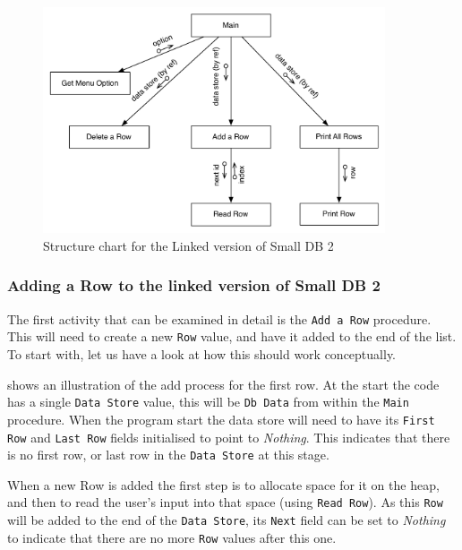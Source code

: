 \begin{figure}[htbp]
   \centering
   \includegraphics[width=0.90\textwidth]{./topics/dynamic-memory/diagrams/LinkedSmallDB2Structure} 
   \caption{Structure chart for the Linked version of Small DB 2}
   \label{fig:linked-small-db-2-struct}
\end{figure}

\clearpage
\subsubsection{Adding a Row to the linked version of Small DB 2} %
\label{ssub:adding_a_row_to_the_linked_version_of_small_db_2}

The first activity that can be examined in detail is the \texttt{Add a Row} procedure. This will need to create a new \texttt{Row} value, and have it added to the end of the list. To start with, let us have a look at how this should work conceptually.

 shows an illustration of the add process for the first row. At the start the code has a single \texttt{Data Store} value, this will be \texttt{Db Data} from within the \texttt{Main} procedure. When the program start the data store will need to have its \texttt{First Row} and \texttt{Last Row} fields initialised to point to \emph{Nothing}. This indicates that there is no first row, or last row in the \texttt{Data Store} at this stage.

When a new Row is added the first step is to allocate space for it on the heap, and then to read the user's input into that space (using \texttt{Read Row}). As this \texttt{Row} will be added to the end of the \texttt{Data Store}, its \texttt{Next} field can be set to \emph{Nothing} to indicate that there are no more \texttt{Row} values after this one. 

